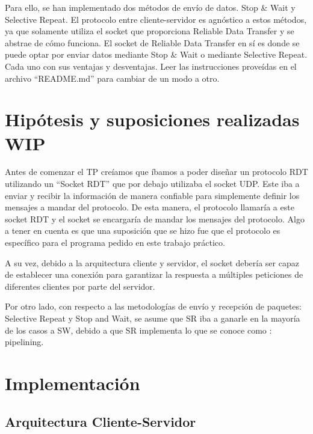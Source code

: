 \documentclass{article}
\begin{document}
Para ello, se han implementado dos métodos de envío de datos. Stop \& Wait y Selective Repeat. El protocolo entre cliente-servidor es agnóstico a estos métodos, ya que solamente utiliza el socket que proporciona Reliable Data Transfer y se abstrae de cómo funciona. El socket de Reliable Data Transfer en sí es donde se puede optar por enviar datos mediante Stop \& Wait o mediante Selective Repeat. Cada uno con sus ventajas y desventajas. Leer las instrucciones proveídas en el archivo ``README.md'' para cambiar de un modo a otro.

\section{\texorpdfstring{\textbf{Hipótesis y suposiciones realizadas
WIP}}{Hipótesis y suposiciones realizadas}}\label{hipuxf3tesis-y-suposiciones-realizadas-wip}

Antes de comenzar el TP creíamos que íbamos a poder diseñar un protocolo RDT utilizando un ``Socket RDT'' que por debajo utilizaba el socket UDP. Este iba a enviar y recibir la información de manera confiable para simplemente definir los mensajes a mandar del protocolo. De esta manera, el protocolo llamaría a este socket RDT y el socket se encargaría de mandar los mensajes del protocolo. Algo a tener en cuenta es que una suposición que se hizo fue que el protocolo es específico para el programa pedido en este trabajo práctico.

A su vez, debido a la arquitectura cliente y servidor, el socket debería ser capaz de establecer una conexión para garantizar la respuesta a múltiples peticiones de diferentes clientes por parte del servidor.

Por otro lado, con respecto a las metodologías de envío y recepción de paquetes: Selective Repeat y Stop and Wait, se asume que SR iba a ganarle en la mayoría de los casos a SW, debido a que SR implementa lo que se conoce como : pipelining.

\section{\texorpdfstring{\textbf{Implementación}}{Implementación}}\label{implementaciuxf3n-wip}

\subsection{Arquitectura Cliente-Servidor}\label{arquitectura-cliente-servidor}
\end{document}
